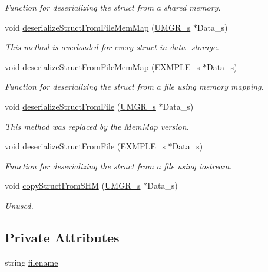 \begin{DoxyCompactItemize}
\begin{DoxyCompactList}\small\item\em Function for deserializing the struct from a shared memory. \end{DoxyCompactList}\item 
void \hyperlink{classdeserializer_a5c34f1218c96b702dee10f34229c3253}{deserialize\+Struct\+From\+File\+Mem\+Map} (\hyperlink{structUMGR__s}{U\+M\+G\+R\+\_\+s} $\ast$Data\+\_\+s)
\begin{DoxyCompactList}\small\item\em This method is overloaded for every struct in data\+\_\+storage. \end{DoxyCompactList}\item 
void \hyperlink{classdeserializer_ac2d58e3468d72863414cfd8c9bdcd323}{deserialize\+Struct\+From\+File\+Mem\+Map} (\hyperlink{structEXMPLE__s}{E\+X\+M\+P\+L\+E\+\_\+s} $\ast$Data\+\_\+s)
\begin{DoxyCompactList}\small\item\em Function for deserializing the struct from a file using memory mapping. \end{DoxyCompactList}\item 
void \hyperlink{classdeserializer_ab70dbab4bfa05c09a648b02514be8c2f}{deserialize\+Struct\+From\+File} (\hyperlink{structUMGR__s}{U\+M\+G\+R\+\_\+s} $\ast$Data\+\_\+s)
\begin{DoxyCompactList}\small\item\em This method was replaced by the Mem\+Map version. \end{DoxyCompactList}\item 
void \hyperlink{classdeserializer_a545372d67a9795603afe503efc98f6f3}{deserialize\+Struct\+From\+File} (\hyperlink{structEXMPLE__s}{E\+X\+M\+P\+L\+E\+\_\+s} $\ast$Data\+\_\+s)
\begin{DoxyCompactList}\small\item\em Function for deserializing the struct from a file using iostream. \end{DoxyCompactList}\item 
void \hyperlink{classdeserializer_ad4cad955149bad72748d525d3207273d}{copy\+Struct\+From\+S\+HM} (\hyperlink{structUMGR__s}{U\+M\+G\+R\+\_\+s} $\ast$Data\+\_\+s)
\begin{DoxyCompactList}\small\item\em Unused. \end{DoxyCompactList}\end{DoxyCompactItemize}
\subsection*{Private Attributes}
\begin{DoxyCompactItemize}
\item 
string \hyperlink{classdeserializer_acef129bae806d64a1692d805c3755ce4}{filename}
\end{DoxyCompactItemize}


